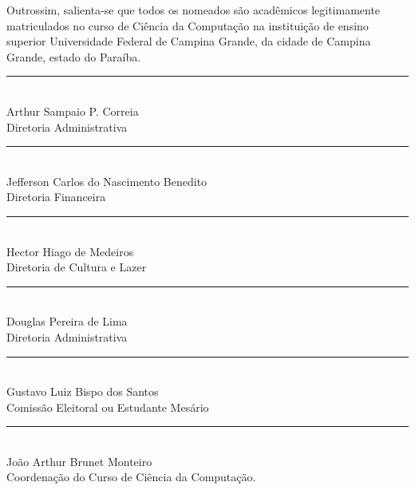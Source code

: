 \documentclass[11pt,letterpaper]{article}
\begin{document}
Outrossim, salienta-se que todos os nomeados são acadêmicos legitimamente matriculados no curso de Ciência da Computação na instituição de ensino superior Universidade Federal de Campina Grande, da cidade de Campina Grande, estado do Paraíba. \\

\begin{multicols}{2}
  \begin{center}
  \rule[]{3in}{0.1pt} \\
  Arthur Sampaio P. Correia\\ Diretoria Administrativa\\
  \end{center}

  \begin{center}
  \rule[]{3in}{0.1pt} \\
  Jefferson Carlos do Nascimento Benedito\\ Diretoria Financeira\\
  \end{center}

  \begin{center}
  \rule[]{3in}{0.1pt} \\
  Hector Hiago de Medeiros\\ Diretoria de Cultura e Lazer\\
  \end{center}

  \begin{center}
  \rule[]{3in}{0.1pt} \\
  Douglas Pereira de Lima\\ Diretoria Administrativa\\
  \end{center}

\end{multicols}









\begin{center}
  \rule[]{3in}{0.1pt} \\
  Gustavo Luiz Bispo dos Santos\\ Comissão Eleitoral ou Estudante Mesário\\
\end{center}

\begin{center}
\rule[]{3in}{0.1pt} \\
João Arthur Brunet Monteiro\\ Coordenação do Curso de Ciência da Computação.\\
\end{center}
\end{document}
